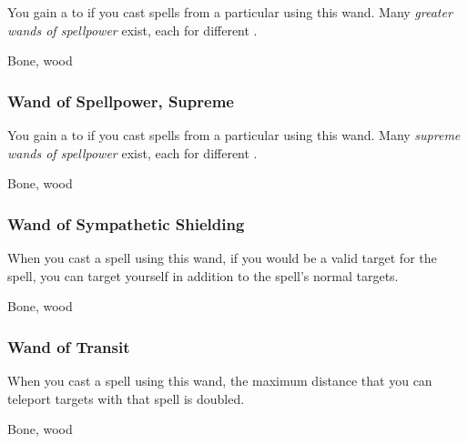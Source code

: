 You gain a   to  if you cast spells from a particular  using this wand.
Many \textit{greater wands of spellpower} exist, each for different .



 


 Bone, wood


\lowercase{\hypertarget{item:Wand of Spellpower, Supreme}{}}\label{item:Wand of Spellpower, Supreme}
\hypertarget{item:Wand of Spellpower, Supreme}{\subsubsection{Wand of Spellpower, Supreme\hfill{}}}

You gain a   to  if you cast spells from a particular  using this wand.
Many \textit{supreme wands of spellpower} exist, each for different .



 


 Bone, wood


\lowercase{\hypertarget{item:Wand of Sympathetic Shielding}{}}\label{item:Wand of Sympathetic Shielding}
\hypertarget{item:Wand of Sympathetic Shielding}{\subsubsection{Wand of Sympathetic Shielding\hfill{}}}

When you cast a   spell using this wand,
if you would be a valid target for the spell,
you can target yourself in addition to the spell's normal targets.



 


 Bone, wood


\lowercase{\hypertarget{item:Wand of Transit}{}}\label{item:Wand of Transit}
\hypertarget{item:Wand of Transit}{\subsubsection{Wand of Transit\hfill{}}}

When you cast a  spell using this wand,
the maximum distance that you can teleport targets with that spell is doubled.



 


 Bone, wood
